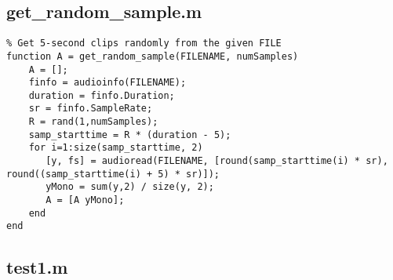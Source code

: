 \documentclass[12pt, a4paper]{article}
\begin{document}
\subsection{get\_random\_sample.m}
\begin{verbatim}
% Get 5-second clips randomly from the given FILE
function A = get_random_sample(FILENAME, numSamples)
    A = [];
    finfo = audioinfo(FILENAME);
    duration = finfo.Duration;
    sr = finfo.SampleRate;
    R = rand(1,numSamples);
    samp_starttime = R * (duration - 5);
    for i=1:size(samp_starttime, 2)
       [y, fs] = audioread(FILENAME, [round(samp_starttime(i) * sr), round((samp_starttime(i) + 5) * sr)]);
       yMono = sum(y,2) / size(y, 2);
       A = [A yMono];
    end
end
\end{verbatim}

\subsection{test1.m}
\end{document}
